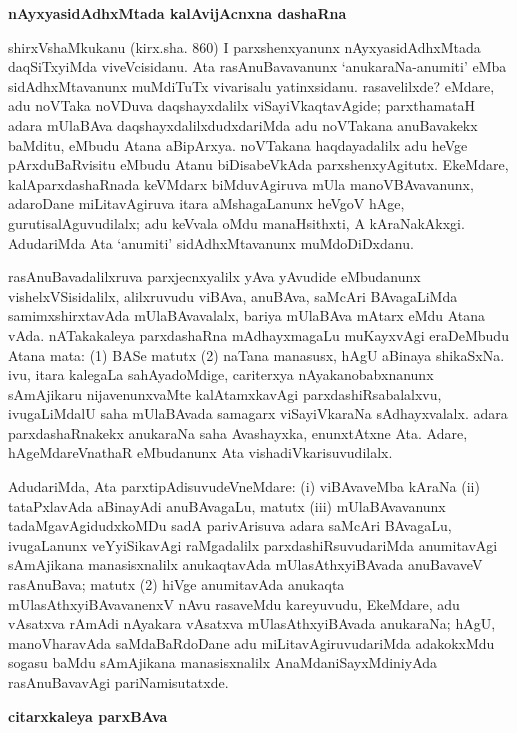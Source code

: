 \smallskip
\begin{center}
{\Large\bf nAyxyasidAdhxMtada kalAvijAcnxna dashaRna}
\end{center}

shirxVshaMkukanu (kirx.sha. 860) I parxshenxyanunx nAyxyasidAdhxMtada daqSiTxyiMda viveVcisidanu. Ata rasAnuBavavanunx `anukaraNa-anumiti' eMba sidAdhxMtavanunx muMdiTuTx vivarisalu yatinxsidanu. rasavelilxde? eMdare, adu noVTaka noVDuva daqshayxdalilx viSayiVkaqtavAgide; parxthamataH adara mUlaBAva daqshayxdalilxdudxdariMda adu noVTakana anuBavakekx baMditu, eMbudu Atana aBipArxya. noVTakana haqdayadalilx adu heVge pArxduBaRvisitu eMbudu Atanu biDisabeVkAda parxshenxyAgitutx. EkeMdare, kalAparxdashaRnada keVMdarx biMduvAgiruva mUla manoVBAvavanunx, adaroDane miLitavAgiruva itara aMshagaLanunx heVgoV hAge, gurutisalAguvudilalx; adu keVvala oMdu manaHsithxti, A kAraNakAkxgi. AdudariMda Ata `anumiti' sidAdhxMtavanunx muMdoDiDxdanu.

rasAnuBavadalilxruva parxjecnxyalilx yAva yAvudide eMbudanunx vishelxVSisidalilx, alilxruvudu viBAva, anuBAva, saMcAri BAvagaLiMda samimxshirxtavAda mUlaBAvavalalx, bariya mUlaBAva mAtarx eMdu Atana vAda. nATakakaleya parxdashaRna mAdhayxmagaLu muKayxvAgi eraDeMbudu Atana mata: (1) BASe matutx (2) naTana \hbox{manasusx}, hAgU aBinaya shikaSxNa. ivu, itara kalegaLa sahAyadoMdige, cariterxya nAyakanobabx\-nanunx sAmAjikaru nijavenunxvaMte kalAtamxkavAgi parxdashiRsabalalxvu, ivugaLiMdalU saha mUlaBAvada samagarx viSayiVkaraNa sAdhayxvalalx. adara parxdashaRnakekx anukaraNa saha Avashayxka, enunxtAtxne Ata. Adare, hAgeMdareVnathaR eMbudanunx Ata vishadiVkarisu\-vudilalx.

AdudariMda, Ata parxtipAdisuvudeVneMdare: {\rm(i)} viBAvaveMba kAraNa {\rm(ii)}~ tataPxlavAda aBinayAdi anuBAvagaLu, matutx {\rm(iii)} mUlaBAvavanunx tadaMga\-vAgidudxkoMDu sadA parivArisuva adara saMcAri BAvagaLu, ivugaLanunx veYyi\-SikavAgi raMgadalilx parxdashiRsuvudariMda anumitavAgi sAmAjikana manasisxnalilx anu\-kaqtavAda mUlasAthxyiBAvada anuBavaveV rasAnuBava; matutx (2) hiVge anumita\-vAda anukaqta mUlasAthxyiBAvavanenxV nAvu rasaveMdu kareyuvudu, EkeMdare, adu vAsatxva rAmAdi nAyakara vAsatxva mUlasAthxyiBAvada anukaraNa; hAgU, manoVharavAda saMdaBaRdoDane adu miLitavAgiruvudariMda adakokxMdu sogasu baMdu sAmAjikana manasisxnalilx AnaMdaniSayxMdiniyAda rasAnuBavavAgi pariNamisutatxde.

\smallskip
\begin{center}
{\Large\bf citarxkaleya parxBAva}
\end{center}

